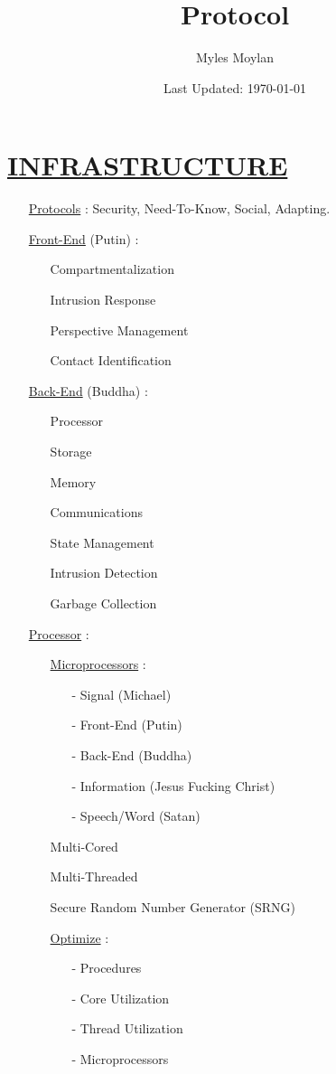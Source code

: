 \documentclass[11pt]{article}
\title{	
	\normalfont \normalsize 
	\huge Protocol
}
\author{Myles Moylan}
\date{Last Updated: \normalsize\today}
\begin{document}
\maketitle
\section*{\ul{INFRASTRUCTURE}}
\begin{enumerate}
	\item[] \ul{Protocols} : Security, Need-To-Know, Social, Adapting.
	
	\item[] \ul{Front-End} (Putin) :
	\begin{enumerate}
		\item[] Compartmentalization
		\item[] Intrusion Response
		\item[] Perspective Management
		\item[] Contact Identification
	\end{enumerate}

	\item[] \ul{Back-End} (Buddha) :
	\begin{enumerate}
		\item[] Processor
		\item[] Storage
		\item[] Memory
		\item[] Communications
		\item[] State Management
		\item[] Intrusion Detection
		\item[] Garbage Collection
	\end{enumerate}

	\item[] \ul{Processor} :
	\begin{enumerate}
		\item[] \ul{Microprocessors} :
		\begin{enumerate}
			\item[-] Signal (Michael)
			\item[-] Front-End (Putin)
			\item[-] Back-End (Buddha)
			\item[-] Information (Jesus Fucking Christ)
			\item[-] Speech/Word (Satan)
		\end{enumerate}
		\item[] Multi-Cored
		\item[] Multi-Threaded
		\item[] Secure Random Number Generator (SRNG)
		\item[] \ul{Optimize}  :
		\begin{enumerate}
			\item[-] Procedures
			\item[-] Core Utilization
			\item[-] Thread Utilization
			\item[-] Microprocessors
		\end{enumerate}
	\end{enumerate}
	

\end{enumerate}
\end{document}
